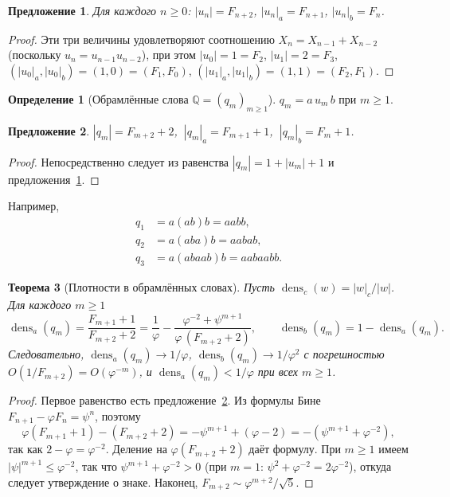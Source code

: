 \documentclass[a4paper,14pt]{extreport}
\theoremstyle{plain}
\newtheorem{theorem}{Теорема}[section]
\newtheorem{proposition}[theorem]{Предложение}
\theoremstyle{definition}
\newtheorem{definition}{Определение}[section]
\theoremstyle{remark}
\begin{document}
\begin{proposition}\label{pro1defnewwordn1}
	Для каждого $n\ge0$: $|u_n|=F_{n+2}$, $|u_n|_a=F_{n+1}$, $|u_n|_b=F_n$.
\end{proposition}
\begin{proof}
	Эти три величины удовлетворяют соотношению $X_n=X_{n-1}+X_{n-2}$ (поскольку $u_n=u_{n-1}u_{n-2}$), при этом $|u_0|=1=F_2$, $|u_1|=2=F_3$,
	$(|u_0|_a,|u_0|_b)=(1,0)=(F_1,F_0)$, $(|u_1|_a,|u_1|_b)=(1,1)=(F_2,F_1)$.
\end{proof}

\begin{definition}[Обрамлённые слова $\mathbb Q=(q_m)_{m\ge1}$]\label{defnewwordn2}
	$q_m=a\,u_m\,b$ при $m\ge1$.
\end{definition}

\begin{proposition}\label{pro1defnewwordn2}
	$|q_m|=F_{m+2}+2$, $\ |q_m|_a=F_{m+1}+1$, $\ |q_m|_b=F_m+1$.
\end{proposition}
\begin{proof}
	Непосредственно следует из равенства $|q_m|=1+|u_m|+1$ и предложения~\ref{pro1defnewwordn1}.
\end{proof}

Например,
\begin{align}
	q_1 &= a(ab)b = aabb,\\
	q_2 &= a(aba)b = aabab,\\
	q_3 &= a(abaab)b = aabaabb .
\end{align}

\begin{theorem}[Плотности в обрамлённых словах]\label{thm1Asymptotic}
	Пусть $\operatorname{dens}_c(w)=|w|_c/|w|$. Для каждого $m\ge1$
	\begin{equation}
		\operatorname{dens}_a(q_m)=\frac{F_{m+1}+1}{F_{m+2}+2}=\frac1\varphi-\frac{\varphi^{-2}+\psi^{m+1}}{\varphi\,(F_{m+2}+2)},
		\qquad
		\operatorname{dens}_b(q_m)=1-\operatorname{dens}_a(q_m).
	\end{equation}
	Следовательно, $\operatorname{dens}_a(q_m)\to1/\varphi$, $\operatorname{dens}_b(q_m)\to1/\varphi^{2}$ с погрешностью
	$O(1/F_{m+2})=O(\varphi^{-m})$, и $\operatorname{dens}_a(q_m)<1/\varphi$ при всех $m\ge1$.
\end{theorem}

\begin{proof}
	Первое равенство есть предложение~\ref{pro1defnewwordn2}. Из формулы Бине $F_{n+1}-\varphi F_n=\psi^n$, поэтому
	\begin{equation}
		\varphi(F_{m+1}+1)-(F_{m+2}+2)=-\psi^{m+1}+(\varphi-2)=-(\psi^{m+1}+\varphi^{-2}),
	\end{equation}
	так как $2-\varphi=\varphi^{-2}$. Деление на $\varphi(F_{m+2}+2)$ даёт формулу. При $m\ge1$ имеем $|\psi|^{m+1}\le\varphi^{-2}$,
	так что $\psi^{m+1}+\varphi^{-2}>0$ (при $m=1$: $\psi^2+\varphi^{-2}=2\varphi^{-2}$), откуда следует утверждение о знаке. Наконец, $F_{m+2}\sim\varphi^{m+2}/\sqrt5$.
\end{proof}
\end{document}

